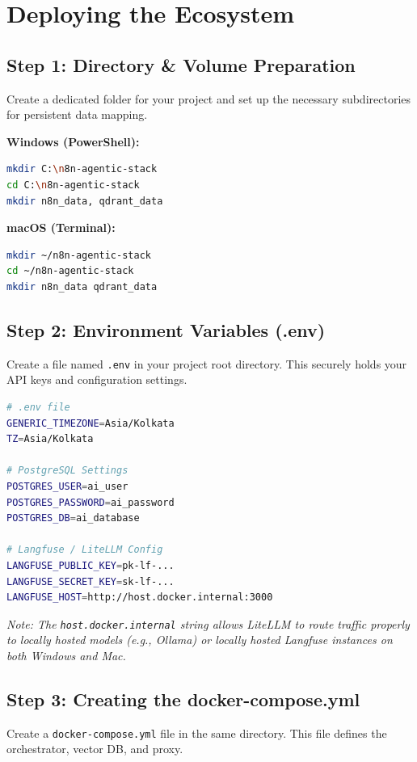 \documentclass[12pt,a4paper]{article}
\begin{document}
\section{Deploying the Ecosystem}

\subsection{Step 1: Directory \& Volume Preparation}
Create a dedicated folder for your project and set up the necessary subdirectories for persistent data mapping.

\textbf{Windows (PowerShell):}
\begin{lstlisting}[language=bash]
mkdir C:\n8n-agentic-stack
cd C:\n8n-agentic-stack
mkdir n8n_data, qdrant_data
\end{lstlisting}

\textbf{macOS (Terminal):}
\begin{lstlisting}[language=bash]
mkdir ~/n8n-agentic-stack
cd ~/n8n-agentic-stack
mkdir n8n_data qdrant_data
\end{lstlisting}

\subsection{Step 2: Environment Variables (.env)}
Create a file named \texttt{.env} in your project root directory. This securely holds your API keys and configuration settings.

\begin{lstlisting}[language=bash]
# .env file
GENERIC_TIMEZONE=Asia/Kolkata
TZ=Asia/Kolkata

# PostgreSQL Settings
POSTGRES_USER=ai_user
POSTGRES_PASSWORD=ai_password
POSTGRES_DB=ai_database

# Langfuse / LiteLLM Config
LANGFUSE_PUBLIC_KEY=pk-lf-...
LANGFUSE_SECRET_KEY=sk-lf-...
LANGFUSE_HOST=http://host.docker.internal:3000
\end{lstlisting}
\textit{Note: The \texttt{host.docker.internal} string allows LiteLLM to route traffic properly to locally hosted models (e.g., Ollama) or locally hosted Langfuse instances on both Windows and Mac.}

\subsection{Step 3: Creating the docker-compose.yml}
Create a \texttt{docker-compose.yml} file in the same directory. This file defines the orchestrator, vector DB, and proxy.
\end{document}
